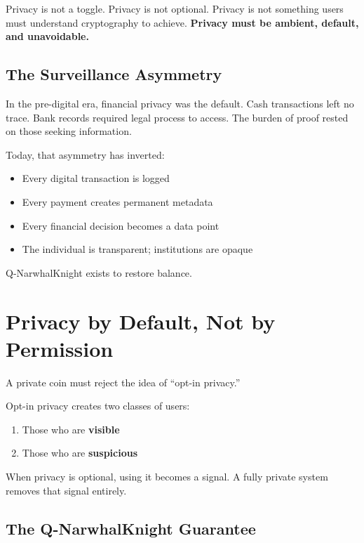 \documentclass[12pt,a4paper]{article}
\begin{document}
\vspace{0.5cm}
Privacy is not a toggle. Privacy is not optional. Privacy is not something users must understand cryptography to achieve. \textbf{Privacy must be ambient, default, and unavoidable.}

\subsection{The Surveillance Asymmetry}

In the pre-digital era, financial privacy was the default. Cash transactions left no trace. Bank records required legal process to access. The burden of proof rested on those seeking information.

Today, that asymmetry has inverted:
\begin{itemize}[leftmargin=2cm]
    \item Every digital transaction is logged
    \item Every payment creates permanent metadata
    \item Every financial decision becomes a data point
    \item The individual is transparent; institutions are opaque
\end{itemize}

Q-NarwhalKnight exists to restore balance.

\section{Privacy by Default, Not by Permission}

A private coin must reject the idea of ``opt-in privacy.''

Opt-in privacy creates two classes of users:
\begin{enumerate}
    \item Those who are \textbf{visible}
    \item Those who are \textbf{suspicious}
\end{enumerate}

When privacy is optional, using it becomes a signal. A fully private system removes that signal entirely.

\subsection{The Q-NarwhalKnight Guarantee}
\end{document}
